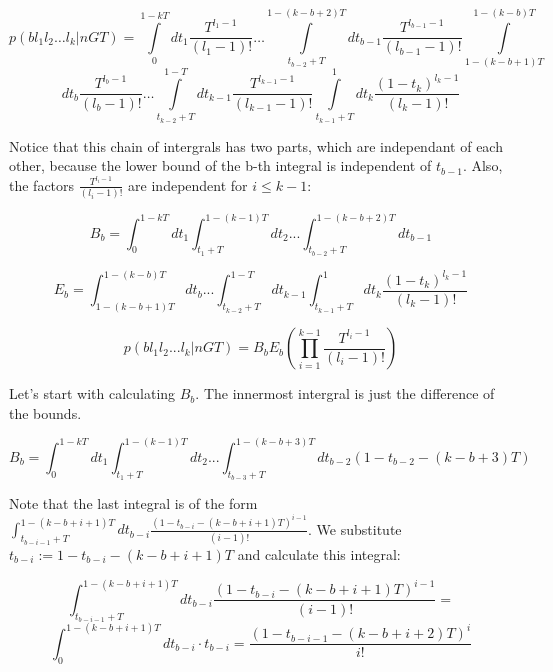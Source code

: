\documentclass{note}
\begin{document}
\begin{solution}
\begin{equation*}
p(b l_1 l_2 \ldots l_k | n G T) = \int\limits_{0}^{1-kT} dt_1 \frac{T^{l_1 - 1}}{(l_1 - 1)!} \ldots \int\limits_{t_{b-2}+T}^{1-(k-b+2)T} dt_{b-1} \frac{T^{l_{b-1} - 1}}{(l_{b-1} - 1)!} \int\limits_{1-(k-b+1)T}^{1-(k-b)T}
\end{equation*}
\begin{equation*}
dt_b \frac{T^{l_b - 1}}{(l_b - 1)!} \ldots \int\limits_{t_{k-2} + T}^{1-T} dt_{k-1} \frac{T^{l_{k-1} - 1}}{(l_{k-1} - 1)!} \int\limits_{t_{k-1} + T}^{1} dt_k \frac{(1-t_k)^{l_k - 1}}{(l_k - 1)!}
\end{equation*}

Notice that this chain of intergrals has two parts, which are independant of each other, because the lower bound of the b-th integral is independent of $t_{b-1}$. Also, the factors $\frac{T^{l_i - 1}}{(l_i - 1)!}$ are independent for $i \leqslant k - 1$:

\begin{equation*}
B_b = \int_{0}^{1-kT} dt_1 \int_{t_1+T}^{1-(k-1)T} dt_2 ... \int_{t_{b-2}+T}^{1-(k-b+2)T} dt_{b-1}
\end{equation*}

\begin{equation*}
E_b = \int_{1-(k-b+1)T}^{1-(k-b)T} dt_b ... \int_{t_{k-2} + T}^{1-T} dt_{k-1} \int_{t_{k-1} + T}^{1} dt_k \frac{(1-t_k)^{l_k - 1}}{(l_k - 1)!}
\end{equation*}

\begin{equation*}
p(b l_1 l_2 ... l_k | n G T) = B_b E_b \left(\prod_{i=1}^{k-1} \frac{T^{l_i - 1}}{(l_i - 1)!}\right)
\end{equation*}

Let's start with calculating $B_b$. The innermost intergral is just the difference of the bounds.

\begin{equation*}
B_b = \int_{0}^{1-kT} dt_1 \int_{t_1+T}^{1-(k-1)T} dt_2 ... \int_{t_{b-3}+T}^{1-(k-b+3)T} dt_{b-2} (1 - t_{b-2} - (k - b + 3)T)
\end{equation*}

Note that the last integral is of the form $\int_{t_{b-i-1}+T}^{1-(k-b+i+1)T} dt_{b-i} \frac{(1 - t_{b-i} - (k - b + i + 1)T)^{i-1}}{(i-1)!}$. We substitute $t_{b-i} := 1 - t_{b-i} - (k - b + i + 1)T$ and calculate this integral:

\begin{equation*}
\int_{t_{b-i-1}+T}^{1-(k-b+i+1)T} dt_{b-i} \frac{(1 - t_{b-i} - (k - b + i + 1)T)^{i-1}}{(i-1)!} = 
\end{equation*}
\begin{equation*}
\int_{0}^{1-(k-b+i+1)T} dt_{b-i} \cdot t_{b-i} = \frac{(1 - t_{b-i-1} - (k - b + i + 2)T)^i}{i!}
\end{equation*}


\end{solution}
\end{document}
